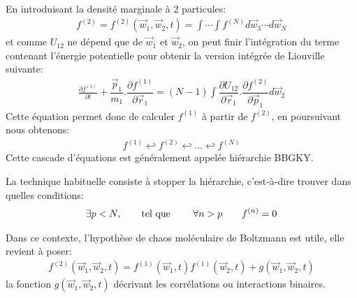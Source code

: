 En introduisant la densité marginale à 2 particules:
\begin{align*}
	f^{(2)}=f^{(2)}(\vec{w}_{1},\vec{w}_{2},t)=\int\cdots\int f^{(N)}d\vec{w}_{3}\cdots d\vec{w}_{N}
\end{align*}
et comme $U_{12}$ ne dépend que de $\vec{w}_{1}$ et $\vec{w}_{2}$, on peut finir l'intégration du terme contenant l'énergie potentielle pour
obtenir la version intégrée de Liouville suivante:
\begin{align}
	\frac{\partial f^{(1)}}{\partial t}+\dfrac{\vec{p}_{1}}{m_{1}}.\dfrac{\partial f^{(1)}}{\partial\vec{r}_{1}}=\left(  N-1\right)
	\displaystyle \int\dfrac{\partial U_{12}}{\partial\vec{r}_{1}}.\dfrac{\partial f^{(2)}}{\partial\vec{p}_{1}}d\vec{w}_{2}%
	\label{liouint}%
\end{align}
Cette équation permet donc de calculer $f^{(1)}$ à partir de $f^{(2)}$, en poursuivant nous obtenons:
\begin{align*}
	f^{(1)}\hookleftarrow f^{(2)}\hookleftarrow...\hookleftarrow f^{(N)}
\end{align*}
Cette cascade d'équations est généralement appelée
hiérarchie BBGKY.

La technique habituelle consiste à stopper la hiérarchie, c'est-à-dire trouver dans quelles conditions:
\begin{align*}
	\exists p<N,\qquad\text{tel que \qquad}\forall n>p\qquad f^{\left(  n\right) }=0
\end{align*}


Dans ce contexte, l'hypothèse de chaos moléculaire de Boltzmann est utile, elle revient à poser:
\begin{align*}
	f^{(2)}(\vec{w}_{1},\vec{w}_{2},t)=f^{(1)}(\vec{w}_{1},t)f^{(1)}(\vec{w}_{2},t)+g(\vec{w}_{1},\vec{w}_{2},t)
\end{align*}
la fonction $g(\vec{w}_{1},\vec{w}_{2},t)$ décrivant les corrélations ou interactions binaires.

